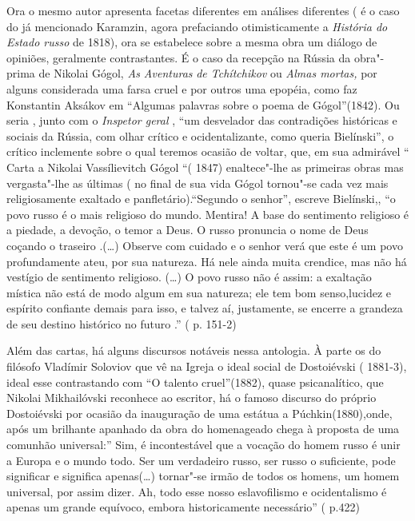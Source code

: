 Ora o mesmo autor apresenta facetas diferentes em análises diferentes (
é o caso do já mencionado Karamzin, agora prefaciando otimisticamente a
\emph{História do Estado russo} de 1818), ora se estabelece sobre a
mesma obra um diálogo de opiniões, geralmente contrastantes. É o caso da
recepção na Rússia da obra"-prima de Nikolai Gógol, \emph{As Aventuras}
\emph{de Tchítchikov} ou \emph{Almas mortas,} por alguns considerada uma
farsa cruel e por outros uma epopéia, como faz Konstantin Aksákov em
``Algumas palavras sobre o poema de Gógol''(1842). Ou seria , junto com
o \emph{Inspetor geral} , ``um desvelador das contradições históricas e
sociais da Rússia, com olhar crítico e ocidentalizante, como queria
Bielínski'', o crítico inclemente sobre o qual teremos ocasião de
voltar, que, em sua admirável `` Carta a Nikolai Vassílievitch Gógol ``(
1847) enaltece"-lhe as primeiras obras mas vergasta"-lhe as últimas ( no
final de sua vida Gógol tornou"-se cada vez mais religiosamente exaltado
e panfletário).``Segundo o senhor'', escreve Bielínski,, ``o povo russo
é o mais religioso do mundo. Mentira! A base do sentimento religioso é a
piedade, a devoção, o temor a Deus. O russo pronuncia o nome de Deus
coçando o traseiro .(\ldots{}) Observe com cuidado e o senhor verá que este é
um povo profundamente ateu, por sua natureza. Há nele ainda muita
crendice, mas não há vestígio de sentimento religioso. (\ldots{}) O povo
russo não é assim: a exaltação mística não está de modo algum em sua
natureza; ele tem bom senso,lucidez e espírito confiante demais para
isso, e talvez aí, justamente, se encerre a grandeza de seu destino
histórico no futuro .'' ( p. 151-2)

Além das cartas, há alguns discursos notáveis nessa antologia. À parte
os do filósofo Vladímir Soloviov que vê na Igreja o ideal social de
Dostoiévski ( 1881-3), ideal esse contrastando com ``O talento
cruel''(1882), quase psicanalítico, que Nikolai Mikhailóvski reconhece
ao escritor, há o famoso discurso do próprio Dostoiévski por ocasião da
inauguração de uma estátua a Púchkin(1880),onde, após um brilhante
apanhado da obra do homenageado chega à proposta de uma comunhão
universal:'' Sim, é incontestável que a vocação do homem russo é unir a
Europa e o mundo todo. Ser um verdadeiro russo, ser russo o suficiente,
pode significar e significa apenas(\ldots{}) tornar"-se irmão de todos os
homens, um homem universal, por assim dizer. Ah, todo esse nosso
eslavofilismo e ocidentalismo é apenas um grande equívoco, embora
historicamente necessário'' ( p.422)

